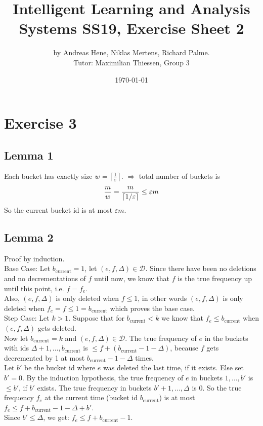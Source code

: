 \documentclass{article}
\DeclarePairedDelimiter\ceil{\lceil}{\rceil}
\begin{document}
\title{Intelligent Learning and Analysis Systems SS19, Exercise Sheet 2}
\author{by Andreas Hene, Niklas Mertens, Richard Palme.\\
Tutor: Maximilian Thiessen, Group 3}
\date{\today}
\maketitle

\section*{Exercise 3}
\subsection*{Lemma 1}
Each bucket has exactly size $ w = \ceil*{\frac{1}{\varepsilon}}$.
$\Rightarrow$ total number of buckets is
\[
\frac{m}{w} = \frac{m}{\ceil*{1/\varepsilon}} \leq \varepsilon m
\]
So the current bucket id is at most $\varepsilon m$.

\subsection*{Lemma 2}
Proof by induction. \\
Base Case: Let $b_{\text{current}} = 1$, let $(e, f, \Delta) \in \mathcal{D}$.
Since there have been no deletions and no decrementations of $f$ until now,
we know that $f$ is the true frequency up until this point, i.e. $f = f_e$. \\

Also, $(e, f, \Delta)$ is only deleted when $f \leq 1$, in other words $(e, f, \Delta)$ is only deleted when $f_e = f \leq 1 = b_{\text{current}}$ which proves the base case. \\

Step Case: Let $k > 1$. Suppose that for $b_{\text{current}} < k$ we know that $f_e \leq b_{\text{current}}$ when $(e, f, \Delta)$ gets deleted. \\

Now let $b_{\text{current}} = k$ and $(e, f, \Delta) \in \mathcal{D}$.
The true frequency of $e$ in the buckets with ids $\Delta+1, \hdots, b_{\text{current}}$
is $\leq f + (b_{\text{current}}-1 - \Delta)$, because $f$ gets decremented by 1 at most $b_{\text{current}} -1 -\Delta$ times. \\
Let $b'$ be the bucket id where $e$ was deleted the last time, if it exists.
Else set $b'=0$. By the induction hypothesis, the true frequency of $e$ in buckets
$1, \hdots, b'$ is $\leq b'$, if $b'$ exists. The true frequency in buckets
$b'+1, \hdots, \Delta$ is $0$. So the true frequency $f_e$ at the current time
(bucket id $b_{\text{current}}$) is at most $f_e \leq f + b_{\text{current}}-1 - \Delta + b'$. \\
Since $b' \leq \Delta$, we get: $f_e \leq f + b_{\text{current}} - 1$.\\
\end{document}
